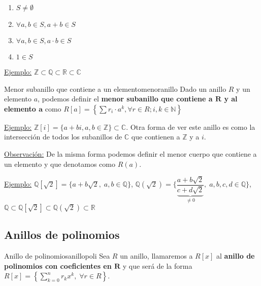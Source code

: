 \documentclass[10pt, a4paper]{article}
\newcommand{\R}{\mathbb{R}}
\newcommand{\N}{\mathbb{N}}
\newcommand{\Z}{\mathbb{Z}}
\newcommand{\C}{\mathbb{C}}
\newcommand{\Q}{\mathbb{Q}}
\newcommand{\obs}{\underline{Observación:} }
\newcommand{\ej}{\underline{Ejemplo:} }
\begin{document}
\begin{enumerate}[label=\arabic*)]
	\item $S \neq \emptyset$
	\item $\forall a, b \in S, a + b \in S$
	\item $\forall a, b \in S, a \cdot b \in S$
	\item $1 \in S$
\end{enumerate}

\vspace{3mm}

\ej $\Z \subset \Q \subset \R \subset \C$

\begin{definition}{Menor subanillo que contiene a un elemento}{menoranillo}
Dado un anillo $R$ y un elemento $a$, podemos definir el \textbf{menor subanillo que contiene a $\mathbf{R}$ y al elemento $\mathbf{a}$} como $R[a] = \left \{ \displaystyle\sum r_i \cdot a^k, \forall r \in R; i, k \in \N \right \}$
\end{definition}

\ej $\Z[i] = \{a + bi, a, b \in \Z\} \subset \C$. Otra forma de ver este anillo es como la intersección de todos los subanillos de $\C$ que contienen a $\Z$ y a $i$.

\vspace{3mm}

\obs De la misma forma podemos definir el menor cuerpo que contiene a un elemento y que denotamos como $R(a)$.

\vspace{3mm}

\ej $\Q[\sqrt{2}] = \{a + b\sqrt{2}, \; a, b \in \Q\}$, $\Q(\sqrt{2}) = \bigg \{ \dfrac{a + b\sqrt{2}}{\underbrace{c + d\sqrt{2}}_{\neq 0}}, \; a, b, c, d \in \Q \bigg \}$, $\Q \subset \Q[\sqrt{2}] \subset \Q(\sqrt{2}) \subset \R$

\subsection{Anillos de polinomios}

\vspace{3mm}

\begin{definition}{Anillo de polinomios}{anillopoli}
Sea $R$ un anillo, llamaremos a $R[x]$ al \textbf{anillo de polinomios con coeficientes en $\mathbf{R}$} y que será de la forma $R[x] = \left \{ \displaystyle\sum_{k = 0}^{n} r_k x^k, \; \forall r \in R \right \}$.
\end{definition}
\end{document}
